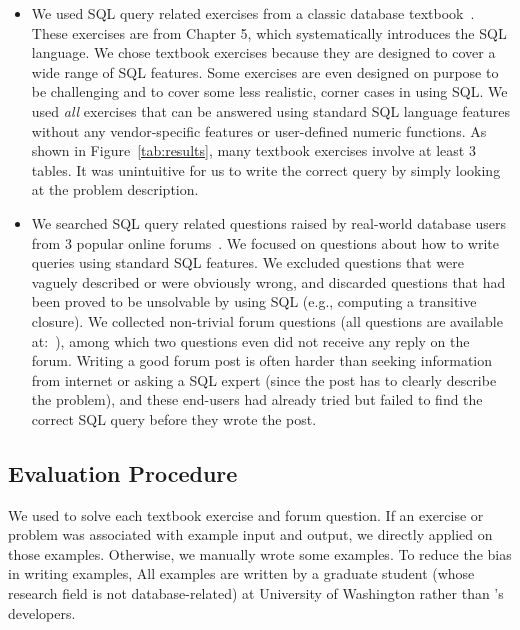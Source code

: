 \begin{itemize}
\item We used \allex SQL query related exercises
from a classic database textbook~\cite{cowbook}.
These exercises are from Chapter 5, which systematically
introduces the SQL language. We chose textbook exercises
because they are designed to
cover a wide range of SQL features. Some exercises
are even designed on purpose to be challenging and to cover some less realistic,
corner cases in using SQL. 
We used \textit{all} exercises that can be answered using standard
SQL language features without any vendor-specific
features or user-defined numeric functions.
As shown in Figure~\ref{tab:results},
many textbook exercises involve at least 3 tables. It was unintuitive
for us to write the correct query by simply looking at the problem
description.

\item We searched SQL query related questions raised by real-world
database users from 3 popular online forums~\cite{stackoverflow,
tutorialized, dbjournal}.
We focused on questions about how to write queries
using standard SQL features.
We excluded questions that were vaguely described or were obviously
wrong, and discarded questions that had been proved
to be unsolvable by using SQL (e.g., computing a
transitive closure).
We collected \pnum non-trivial forum questions
(all questions are available at:~\cite{forumq}), among which
two questions even did not receive any reply on the forum.
Writing a good forum post is often harder than seeking 
information from internet or asking
a SQL expert (since the post has to clearly 
describe the problem), and these end-users had already tried but
failed to find the correct SQL query before they wrote the post.
\end{itemize}



\vspace{-2mm}
\subsection{Evaluation Procedure}
\vspace{-1mm}

We used \ourtool to solve each textbook exercise and forum
question. If an exercise or problem
was associated with example input and output,
we directly applied \ourtool on those examples.
Otherwise, we manually wrote some examples.
To reduce the bias in writing
examples, 
All examples are written by a graduate
student (whose research field is not database-related) at
University of Washington rather than
\ourtool's developers.

